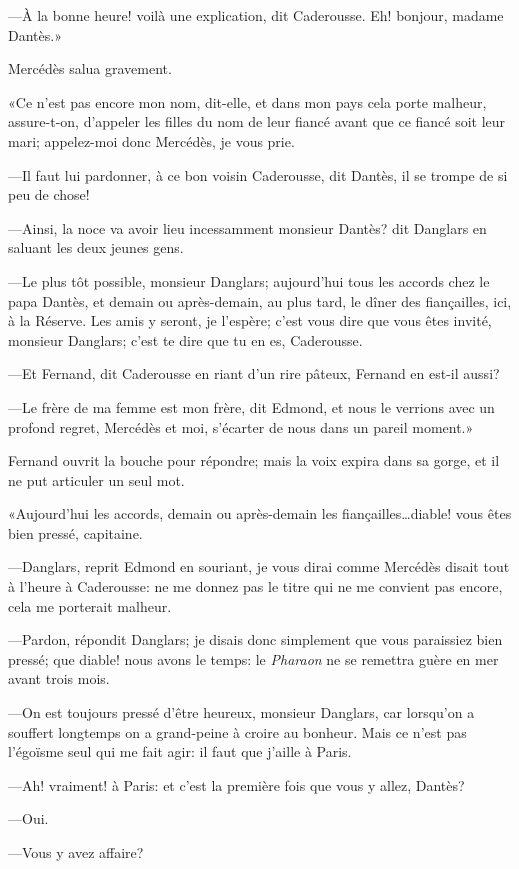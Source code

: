 —À la bonne heure! voilà une explication, dit Caderousse. Eh! bonjour, madame Dantès.»

Mercédès salua gravement.

«Ce n'est pas encore mon nom, dit-elle, et dans mon pays cela porte malheur, assure-t-on, d'appeler les filles du nom de leur fiancé avant que ce fiancé soit leur mari; appelez-moi donc Mercédès, je vous prie.

—Il faut lui pardonner, à ce bon voisin Caderousse, dit Dantès, il se trompe de si peu de chose!

—Ainsi, la noce va avoir lieu incessamment monsieur Dantès? dit Danglars en saluant les deux jeunes gens.

—Le plus tôt possible, monsieur Danglars; aujourd'hui tous les accords chez le papa Dantès, et demain ou après-demain, au plus tard, le dîner des fiançailles, ici, à la Réserve. Les amis y seront, je l'espère; c'est vous dire que vous êtes invité, monsieur Danglars; c'est te dire que tu en es, Caderousse.

—Et Fernand, dit Caderousse en riant d'un rire pâteux, Fernand en est-il aussi?

—Le frère de ma femme est mon frère, dit Edmond, et nous le verrions avec un profond regret, Mercédès et moi, s'écarter de nous dans un pareil moment.»

Fernand ouvrit la bouche pour répondre; mais la voix expira dans sa gorge, et il ne put articuler un seul mot.

«Aujourd'hui les accords, demain ou après-demain les fiançailles\dots diable! vous êtes bien pressé, capitaine.

—Danglars, reprit Edmond en souriant, je vous dirai comme Mercédès disait tout à l'heure à Caderousse: ne me donnez pas le titre qui ne me convient pas encore, cela me porterait malheur.

—Pardon, répondit Danglars; je disais donc simplement que vous paraissiez bien pressé; que diable! nous avons le temps: le \textit{Pharaon} ne se remettra guère en mer avant trois mois.

—On est toujours pressé d'être heureux, monsieur Danglars, car lorsqu'on a souffert longtemps on a grand-peine à croire au bonheur. Mais ce n'est pas l'égoïsme seul qui me fait agir: il faut que j'aille à Paris.

—Ah! vraiment! à Paris: et c'est la première fois que vous y allez, Dantès?

—Oui.

—Vous y avez affaire?

